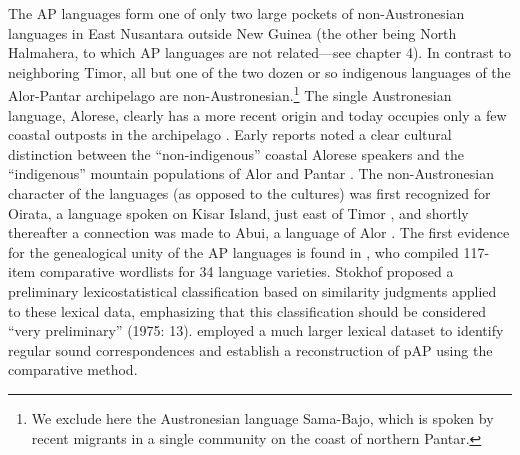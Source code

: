 The AP languages form one of only two large pockets of non-Austronesian languages in East Nusantara outside New Guinea (the other being North Halmahera, to which AP languages are not related---see chapter 4). In contrast to neighboring Timor, all but one of the two dozen or so indigenous languages of the Alor-Pantar archipelago are non-Austronesian.\footnote{ We exclude here the Austronesian language Sama-Bajo, which is spoken by recent migrants in a single community on the coast of northern Pantar.} The single Austronesian language, Alorese, clearly has a more recent origin and today occupies only a few coastal outposts in the archipelago \citep{Klamer2011,Klamer2012}. Early reports noted a clear cultural distinction between the ``non-indigenous'' coastal Alorese speakers and the ``indigenous'' mountain populations of Alor and Pantar \citep[75-8]{Anonymous1914}. The non-Austronesian character of the languages (as opposed to the cultures) was first recognized for Oirata, a 
language spoken on Kisar Island, just east of Timor \citet{DeJong1937}, and shortly thereafter a connection was made to Abui, a language of Alor \citep{Nicolspeyer1940}. The first evidence for the genealogical unity of the AP languages is found in \citet{Stokhof1975}, who compiled 117-item comparative wordlists for 34 language varieties. Stokhof proposed a preliminary lexicostatistical classification based on similarity judgments applied to these lexical data, emphasizing that this classification should be considered ``very preliminary'' (1975: 13). \citep{HoltonEtAl2012} employed a much larger lexical dataset to identify regular sound correspondences and establish a reconstruction of pAP using the comparative method. 

